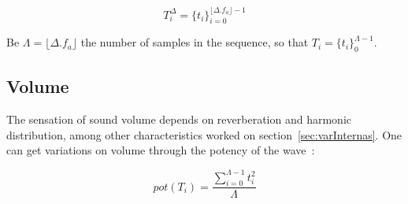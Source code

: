 \documentclass[
 aip,
 jmp,
 amsmath,amssymb,
 reprint,
]{revtex4-1}
\begin{document}
\begin{equation}\label{eq:dur}
T_{i}^{\Delta}={\{t_i\}}_{i=0}^{\lfloor \Delta . f_a \rfloor -1}
\end{equation}

Be $\Lambda=\lfloor \Delta . f_a \rfloor$ the number of samples in the sequence, so that $T_i=\{t_i\}_0^{\Lambda-1}$.

\subsection{Volume}\label{subsec:volume}
The sensation of sound volume depends on reverberation and harmonic distribution, among other characteristics worked on section~\ref{sec:varInternas}. One can get variations on volume through the potency of the wave~\cite{Chowning}:

\begin{equation}\label{eq:potencia}
pot(T_i)=\frac{\sum_{i=0}^{\Lambda -1} t_i^2}{\Lambda}
\end{equation} 
\end{document}
